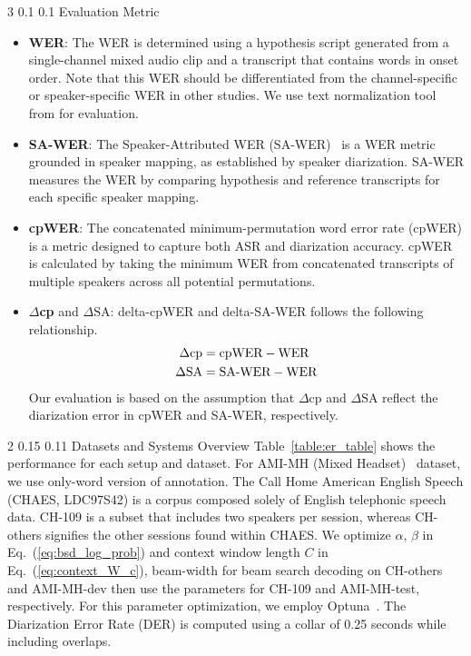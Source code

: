 \documentclass{article}
\makeatletter
\renewcommand{\subsection}{\@startsection
  {subsection}%
  {2}%
  {}%
  {0.15\baselineskip}%
  {0.11\baselineskip}%
  {}}%
\renewcommand{\subsubsection}{\@startsection
  {subsubsection}%
  {3}%
  {}%
  {0.1\baselineskip}%
  {0.1\baselineskip}%
  {}}%
\makeatother
\begin{document}
\subsubsection{Evaluation Metric}

\begin{itemize}[leftmargin=*,labelsep=0.05em]
\item \textbf{WER}: The WER is determined using a hypothesis script generated from a single-channel mixed audio clip and a transcript that contains words in onset order. Note that this WER should be differentiated from the channel-specific or speaker-specific WER in other studies. We use text normalization tool from \cite{openai_whisper} for evaluation.
\item \textbf{SA-WER}: The Speaker-Attributed WER (SA-WER)~\cite{cornell2023chime} is a WER metric grounded in speaker mapping, as established by speaker diarization. SA-WER measures the WER by comparing hypothesis and reference transcripts for each specific speaker mapping. 
\item \textbf{cpWER}: The concatenated minimum-permutation
word error rate (cpWER) \cite{watanabe2020chime} is a metric designed to capture both ASR and diarization accuracy.
cpWER is calculated by taking the minimum WER from concatenated transcripts of multiple speakers across all potential permutations.
\item \textbf{$\Delta$cp} and \textbf{$\Delta\text{SA}$}: delta-cpWER and delta-SA-WER follows the following relationship.
\begin{align*}
\vspace{-4px}
\Delta\text{cp} &= \text{cpWER} - \text{WER} \\
\Delta\text{SA} &= \text{SA-WER} - \text{WER}
\end{align*}
Our evaluation is based on the assumption that $\Delta$cp and $\Delta\text{SA}$ reflect the diarization error in cpWER and SA-WER, respectively.
\end{itemize}
\subsection{Datasets and Systems Overview}
Table~\ref{table:er_table} shows the performance for each setup and dataset. For AMI-MH (Mixed Headset)~\cite{kraaij2005ami} dataset, we use only-word version \cite{landini2022bayesian} of annotation. The Call Home American English Speech (CHAES, LDC97S42) is a corpus composed solely of English telephonic speech data. CH-109 is a subset that includes two speakers per session, whereas CH-others signifies the other sessions found within CHAES. We optimize $\alpha$, $\beta$ in Eq.~(\ref{eq:bsd_log_prob}) and context window length $C$ in Eq.~(\ref{eq:context_W_c}), beam-width for beam search decoding on CH-others and AMI-MH-dev then use the parameters for CH-109 and AMI-MH-test, respectively. For this parameter optimization, we employ Optuna~\cite{akiba2019optuna}. The Diarization Error Rate (DER) is computed using a collar of 0.25 seconds while including overlaps.
\end{document}
